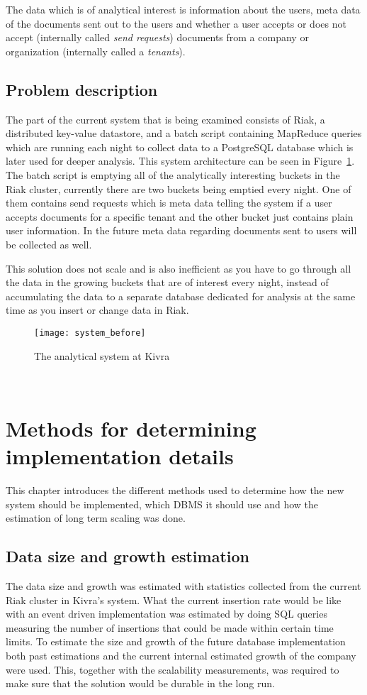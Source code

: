 \documentclass[a4paper,12pt]{article}
\begin{document}
The data which is of analytical interest is information about the users, meta data of the documents sent out to the users and whether a user accepts or does not accept (internally called \emph{send requests}) documents from a company or organization (internally called a \emph{tenants}).

\newpage
\subsection{Problem description}
The part of the current system that is being examined consists of Riak, a distributed key-value datastore, and a batch script containing MapReduce queries which are running each night to collect 
data to a PostgreSQL database which is later used for deeper analysis. This system architecture can be seen in Figure~\ref{fig:before}. 
The batch script is emptying all of the analytically interesting buckets in the Riak cluster,
currently there are two buckets being emptied every night. One of them contains send requests which is meta data telling the system if a user accepts documents for a specific tenant and the other bucket
just contains plain user information. In the future meta data regarding documents sent to users will be collected as well.

This solution does not scale and is also inefficient as you have to go through all the data in the growing buckets that are of interest every night, instead of accumulating the data to a separate database dedicated for analysis 
at the same time as you insert or change data in Riak.

\begin{figure}[h!]
    \vspace{0.25in}
    \centerline{\texttt{[image: system\_before]}}
    \caption{The analytical system at Kivra}
    \label{fig:before}
\end{figure}

~\\
\newpage
\section{Methods for determining\\implementation details}
This chapter introduces the different methods used to determine how the new system should be implemented, which DBMS it should use and how the estimation of long term scaling was done.

\subsection{Data size and growth estimation}
The data size and growth was estimated with statistics collected from the current Riak cluster in Kivra's system. What the current insertion rate would be like with an event driven implementation was estimated 
by doing SQL queries measuring the number of insertions that could be made within certain time limits. 
To estimate the size and growth of the future database implementation both past estimations and the current internal estimated growth of the company were used. 
This, together with the scalability measurements, was required to make sure that the solution would be durable in the long run.
\end{document}
